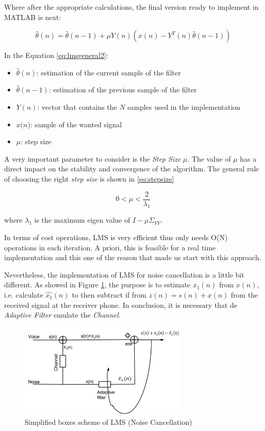 \documentclass[11pt,a4paper,english]{book}  %
\theoremstyle{definition}  %
\theoremstyle{plain}  %
\theoremstyle{remark}  %
\begin{document}
	Where after the appropriate calculations, the final version ready to implement in MATLAB is next:
	
	\begin{equation}
	\label{eq:lmsgeneral2}
		\hat{\theta}(n) = \hat{\theta}(n-1) + \mu Y(n)(x(n)-Y^{T}(n)\hat{\theta}(n-1))
	\end{equation}
	
	In the Equation \ref{eq:lmsgeneral2}:
	
	\begin{itemize}
	\item $\hat{\theta}(n)$: estimation of the current sample of the filter
	\item $\hat{\theta}(n-1)$: estimation of the previous sample of the filter
	\item $Y(n)$: vector that contains the $N$ samples used in the implementation
	\item $x(n$): sample of the wanted signal
	\item $\mu$: step size
	\end{itemize}
	
	A very important parameter to consider is the \textit{Step Size} $\mu$. The value of $\mu$ has a direct impact on the stability and convergence of the algorithm. The general rule of choosing the right \textit{step size} is shown in \ref{eq:stepsize}
	
	\begin{equation}
	\label{lmsmu}
	0 < \mu <\frac{2}{\lambda_{1}} 
	\end{equation}
	
	where $\lambda_{1}$ is the maximum eigen value of $I-\mu \Sigma_{YY}$.
	
	In terms of cost operations, LMS is very efficient thus only needs O(N) operations in each iteration. A priori, this is feasible for a real time implementation and this one of the reason that made us start with this approach.
	
	Nevertheless, the implementation of LMS for noise cancellation is a little bit different. As showed in Figure \ref{fig:simplms}, the purpose is to estimate $x_{1}(n)$ from $x(n)$, i.e. calculate $\hat{x_{1}}(n)$ to then subtract if from $z(n)=s(n)+x(n)$ from the received signal at the receiver phone. In conclusion, it is necessary that de \textit{Adaptive Filter} emulate the \textit{Channel}.
	
		\begin{figure}[h]
		\centering
		\includegraphics[width=8cm]{images/theory/SimplifiedLMS.jpg}
		\caption{Simplified boxes scheme of LMS (Noise Cancellation)}
		\label{fig:simplms}
		\end{figure}
		
\end{document}
